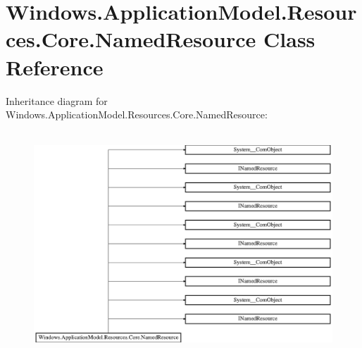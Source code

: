 \hypertarget{class_windows_1_1_application_model_1_1_resources_1_1_core_1_1_named_resource}{}\section{Windows.\+Application\+Model.\+Resources.\+Core.\+Named\+Resource Class Reference}
\label{class_windows_1_1_application_model_1_1_resources_1_1_core_1_1_named_resource}
Inheritance diagram for Windows.\+Application\+Model.\+Resources.\+Core.\+Named\+Resource\+:\begin{figure}[H]
\begin{center}
\leavevmode
\includegraphics[height=8.438356cm]{class_windows_1_1_application_model_1_1_resources_1_1_core_1_1_named_resource}
\end{center}
\end{figure}
